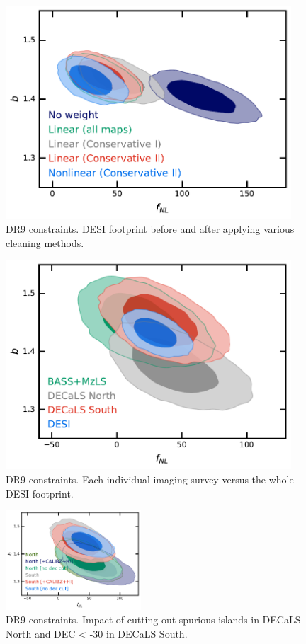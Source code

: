 \begin{figure}
    \centering
    \includegraphics[width=0.95\textwidth]{figures/mcmc_dr9methods.pdf} 
    \caption{DR9 constraints. DESI footprint before and after applying various cleaning methods.}\label{fig:mcmc_dr9}
\end{figure}

\begin{figure}
    \centering
    \includegraphics[width=0.95\textwidth]{figures/mcmc_dr9regions.pdf} 
    \caption{DR9 constraints. Each individual imaging survey versus the whole DESI footprint.}\label{fig:mcmc_dr9reg}
\end{figure}

\begin{figure}
    \centering
    \includegraphics[width=0.45\textwidth]{figures/mcmc_dr9_cutdec.pdf}     
    \caption{DR9 constraints. Impact of cutting out spurious islands in DECaLS North and DEC < -30 in DECaLS South.}\label{fig:mcmc_dr9cuts}
\end{figure}

